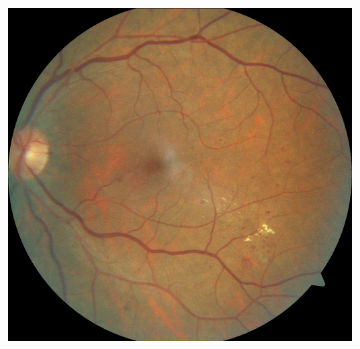 \begin{figure}[!t]
\begin{subfigure}[t]{0.3\textwidth}
\end{subfigure}
\begin{subfigure}[t]{0.3\textwidth}
  \includegraphics[width=\textwidth]{img/zenodo.jpg}
\end{subfigure}

\vspace{0.3cm} %


\end{figure}
